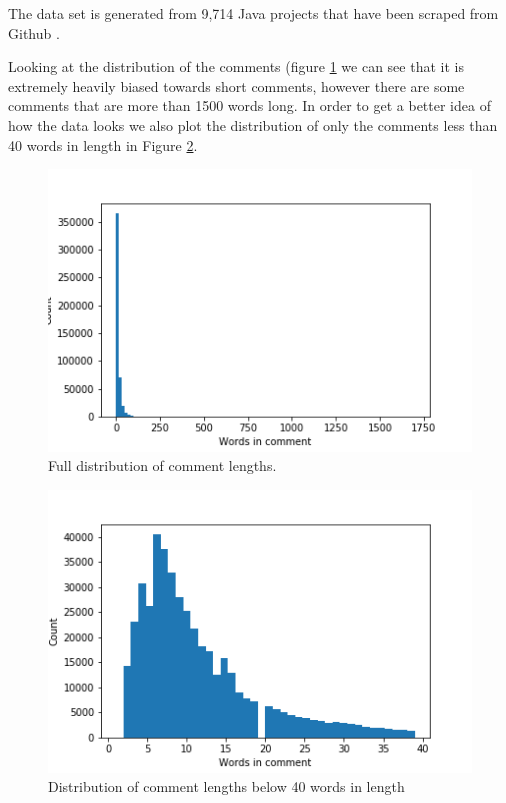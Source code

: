 \documentclass[a4paper,10pt]{article}
\theoremstyle{plain}
\theoremstyle{definition}
\begin{document}
\begin{multicols*}{2}
\begin{table}[H]
    \centering
    \caption{Statistics for codesnipets in DeepComm dataset}
    \label{tab:dataset-statistics}
\end{table}{}

The data set is generated from 9,714 Java projects that have been scraped from Github \cite{hu2018deep}.

Looking at the distribution of the comments (figure \ref{fig:fulldistr} we can see that it is extremely heavily biased towards short comments, however there are some comments that are more than 1500 words long. In order to get a better idea of how the data looks we also plot the distribution of only the comments less than 40 words in length in Figure \ref{fig:zoomeddistr}.

\begin{figure}[H]
    \centering
    \includegraphics[width =0.9 \linewidth]{distr.png}
    \caption{Full distribution of comment lengths.}
    \label{fig:fulldistr}
\end{figure}{}

\begin{figure}[H]
    \centering
    \includegraphics[width = 0.9 \linewidth]{zoomedInLength.png}
    \caption{Distribution of comment lengths below 40 words in length}
    \label{fig:zoomeddistr}
\end{figure}{}



\end{multicols*}
\end{document}
